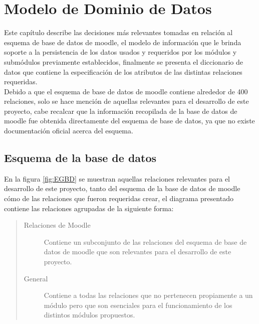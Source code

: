 \chapter{Modelo de Dominio de Datos}
\label{ch:dominioDatos}

 Este capítulo describe las decisiones más relevantes tomadas en relación al esquema de
 base de datos de moodle, el modelo de información que le brinda soporte a la persistencia
 de los datos usados y requeridos por los módulos y submódulos previamente establecidos, 
 finalmente se presenta el diccionario de datos que contiene la especificación de los
 atributos de las distintas relaciones requeridas.\\

 \noindent Debido a que el esquema de base de datos de moodle contiene alrededor de 400
 relaciones, solo se hace mención de aquellas relevantes para el desarrollo de este proyecto,
 cabe recalcar que la información recopilada de la base de datos de moodle fue obtenida
 directamente del esquema de base de datos, ya que no existe documentación oficial acerca
 del esquema.

\section{Esquema de la base de datos}


 En la figura \ref{fig:EGBD} se muestran aquellas relaciones relevantes para el desarrollo
 de este proyecto, tanto del esquema de la base de datos de moodle cómo de las relaciones
 que fueron requeridas crear, el diagrama presentado contiene las relaciones agrupadas
 de la siguiente forma:\\
  
    \begin{quote}
    \begin{description}
        \item[Relaciones de Moodle] Contiene un subconjunto de las relaciones del esquema de
            base de datos de moodle que son relevantes para el desarrollo de este proyecto.\\

        \item[General] Contiene a todas las relaciones que no pertenecen propiamente a un
            módulo pero que son esenciales para el funcionamiento de los distintos módulos
            propuestos.\\

    \end{description}
    \end{quote}

